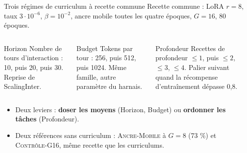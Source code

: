 \documentclass[aspectratio=169,10pt]{beamer}
\newcommand{\hl}[1]{\textcolor{crOrange}{\textbf{#1}}}
\begin{document}

\begin{frame}{Trois régimes de curriculum à recette commune}
Recette commune : LoRA $r{=}8$, taux $3\cdot10^{-6}$, $\beta=10^{-2}$, ancre mobile toutes les quatre époques, $G=16$, 80 époques.
\vspace{0.2cm}
\begin{columns}[T]
\begin{block}{Horizon}
Nombre de tours d'interaction : 10, puis 20, puis 30. Reprise de ScalingInter.
\end{block}
\begin{block}{Budget}
Tokens par tour : 256, puis 512, puis 1024. Même famille, autre paramètre du harnais.
\end{block}
\begin{block}{Profondeur}
Recettes de profondeur $\le 1$, puis $\le 2$, $\le 3$, $\le 4$. Palier suivant quand la récompense d'entraînement dépasse 0,8.
\end{block}
\end{columns}
\vspace{0.3cm}
\begin{itemize}
  \item Deux leviers : \hl{doser les moyens} (Horizon, Budget) ou \hl{ordonner les tâches} (Profondeur).
  \item Deux références sans curriculum : \textsc{Ancre-Mobile} à $G=8$ (73 \%) et \textsc{Contrôle-G16}, même recette que les curriculums.
\end{itemize}
\end{frame}
\end{document}
